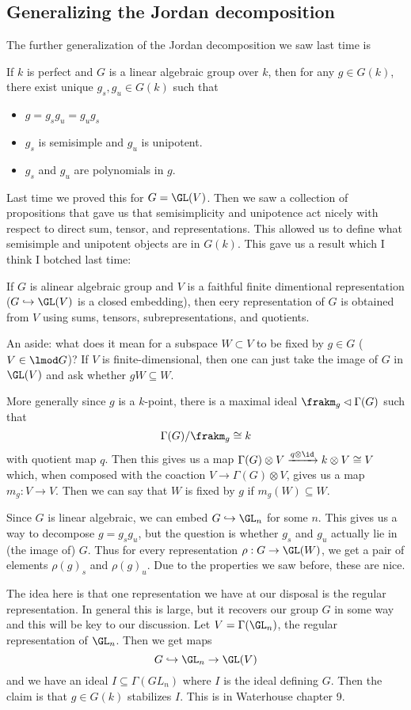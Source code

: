 \documentclass[12pt]{article}
\begin{document}
\subsection{Generalizing the Jordan decomposition}
The further generalization of the Jordan decomposition we saw last time is
\begin{thm}
	If $k$ is perfect and $G$ is a linear algebraic group over $k$, then for any $g\in G(k)$, there exist unique $g_s,g_u\in G(k)$ such that 
	\begin{itemize}
		\item $g=g_sg_u=g_ug_s$
		\item $g_s$ is semisimple and $g_u$ is unipotent.
		\item $g_s$ and $g_u$ are polynomials in $g$.
	\end{itemize}
\end{thm}
Last time we proved this for $G=\GL(V)$. Then we saw a collection of propositions that gave us that semisimplicity and unipotence act nicely 
with respect to direct sum, tensor, and representations. This allowed us to define what semisimple and unipotent objects are in $G(k)$. This gave us 
a result which I think I botched last time:
\begin{prop}
	If $G$ is alinear algebraic group and $V$ is a faithful finite dimentional representation ($G\hookrightarrow \GL(V)$ is a closed embedding), then eery representation 
	of $G$ is obtained from $V$ using sums, tensors, subrepresentations, and quotients.
\end{prop}
\begin{rmk}
	An aside: what does it mean for a subspace $W\subset V$ to be fixed by $g\in G$ ($V\in \lmod G$)? If $V$ is finite-dimensional, then one can just take the image of $G$ in $\GL(V)$
	and ask whether $gW\subseteq W$.

	More generally since $g$ is a $k$-point, there is a maximal ideal $\frakm_g\lhd \Gamma(G)$ such that 
	\[\Gamma(G)/\frakm_g\cong k\] 
	with quotient map $q$. Then this gives us a map $\Gamma(G)\otimes V\xrightarrow{q\otimes\id} k\otimes V\cong V$ which, when composed with the coaction $V\to\Gamma(G)\otimes V$,
	gives us a map $m_g:V\to V$. Then we can say that $W$ is fixed by $g$ if $m_g(W)\subseteq W$.
\end{rmk}
\begin{prf}[in general]
	Since $G$ is linear algebraic, we can embed $G\hookrightarrow\GL_n$ for some $n$. This gives us a way to decompose $g=g_sg_u$, but the question is 
	whether $g_s$ and $g_u$ actually lie in (the image of) $G$. Thus for every representation $\rho:G\to \GL(W)$, we get a pair of elements $\rho(g)_s$ and $\rho(g)_u$. Due to the properties we saw before, 
	these are nice.

	The idea here is that one representation we have at our disposal is the regular representation. In general this is large, but it recovers our group $G$ in some way and this will be key to our discussion.
	Let $V=\Gamma(\GL_n)$, the regular representation of $\GL_n$. Then we get maps 
	\[G\hookrightarrow\GL_n\to\GL(V)\]
	and we have an ideal $I\subseteq \Gamma(GL_n)$ where $I$ is the ideal defining $G$. Then the claim is that $g\in G(k)$ stabilizes $I$. This is in Waterhouse chapter 9.
\end{prf}
\end{document}
